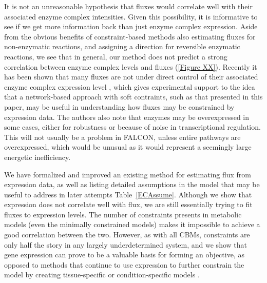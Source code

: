 It is not an unreasonable hypothesis that fluxes would correlate well
with their associated enzyme complex intensities. Given this
possibility, it is informative to see if we get more information back
than just enzyme complex expression. Aside from the obvious benefits
of constraint-based methods also estimating fluxes for non-enzymatic
reactions, and assigning a direction for reversible enzymatic
reactions, we see that in general, our method does not predict a
strong correlation between enzyme complex levels and fluxes
(\ref{Figure XX}). Recently it has been shown that many fluxes are not
under direct control of their associated enzyme complex expression
level \citep{Chubukov2013}, which gives experimental support to the idea that a
network-based approach with soft contraints, such as that presented in
this paper, may be useful in understanding how fluxes may be
constrained by expression data. The authors also note that
enzymes may be overexpressed in some cases, either for robustness or
because of noise in transcriptional regulation. This will not usually
be a problem in FALCON, unless entire pathways are overexpressed,
which would be unusual as it would represent a seemingly large
energetic inefficiency.

We have formalized and improved an existing method for estimating flux
from expression data, as well as listing detailed assumptions in the
model that may be useful to address in later attempts Table~\ref{ECAssume}.
Although we show that expression does not correlate well with flux, we
are still essentially trying to fit fluxes to expression levels.  The
number of constraints presents in metabolic models (even the minimally
constrained models) makes it impossible to achieve a good correlation
between the two. However, as with all CBMs, constraints are only half
the story in any largely underdetermined system, and we show that gene
expression can prove to be a valuable basis for forming an objective,
as opposed to methods that continue to use expression to further
constrain the model by creating tissue-specific or condition-specific
models \citep{Wang2012,Shlomi2008,Becker2008}.

